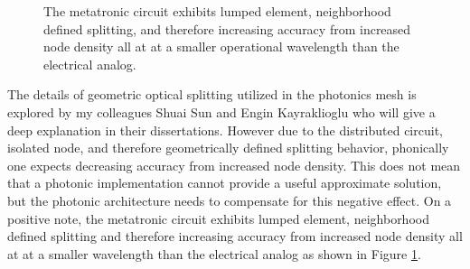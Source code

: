 \begin{figure}[ht]
\centering{}
\caption{The metatronic circuit exhibits lumped element, neighborhood defined splitting, and therefore increasing accuracy from increased node density all at at a smaller operational wavelength than the electrical analog.}
\label{fig:1_03b_mt_accuracy.png}
\end{figure} 

\par The details of geometric optical splitting utilized in the photonics mesh is explored by my colleagues Shuai Sun and Engin Kayraklioglu who will give a deep explanation in their dissertations. However due to the distributed circuit, isolated node, and therefore geometrically defined splitting behavior, phonically one expects decreasing accuracy from increased node density. This does not mean that a photonic implementation cannot provide a useful approximate solution, but the photonic architecture needs to compensate for this negative effect. On a positive note, the metatronic circuit exhibits lumped element, neighborhood defined splitting and therefore increasing accuracy from increased node density all at at a smaller wavelength than the electrical analog as shown in Figure \ref{fig:1_03b_mt_accuracy.png}.
 

